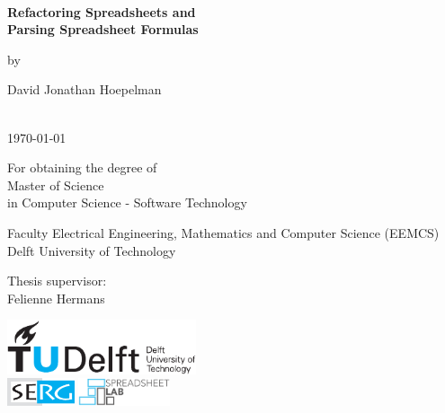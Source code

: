 \thispagestyle{empty}
\onecolumn
{%
\sffamily
\centering

~\vspace{\fill}

{\huge \bfseries
Refactoring Spreadsheets and \\ Parsing Spreadsheet Formulas
}

\vspace{2.0cm}

by

\vspace{2.0cm}

{\LARGE
David Jonathan Hoepelman
}

\vspace{2.5cm}

 \\
\today

\vspace{2cm}

For obtaining the degree of \\
Master of Science \\
in Computer Science - Software Technology \\

\vspace{0.5cm}

Faculty Electrical Engineering, Mathematics and Computer Science (EEMCS)\\
Delft University of Technology

\vspace{0.5cm}

Thesis supervisor: \\
Felienne Hermans

\vspace{1.5cm}

\includegraphics[height=16mm]{0-title/tudelft.pdf}
\\ %
\vspace{0.75cm}
\includegraphics[height=8mm]{0-title/serg}
\hspace{0.5cm}
\includegraphics[height=8mm]{0-title/spreadsheet-lab}

\vspace{\fill}

}